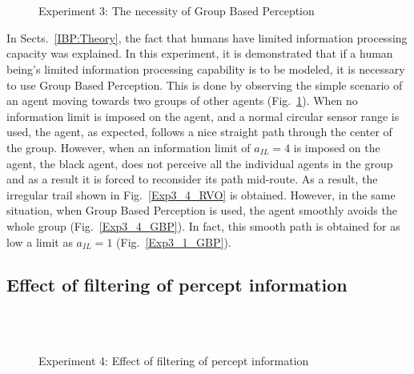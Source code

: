 \begin{figure}[!t]
  \centering
   \\
    \hspace{1pt}
  \\
  \hspace{1pt}
  \caption{Experiment 3: The necessity of Group Based Perception}
  \label{Exp3}
\end{figure}

In Sects.~\ref{IBP:Theory}, the fact that humans have limited information processing capacity was explained. In this experiment, it is demonstrated that if a human being's limited information processing capability is to be modeled, it is necessary to use Group Based Perception. This is done by observing the simple scenario of an agent moving towards two groups of other agents (Fig.~\ref{Exp3}). When no information limit is imposed on the agent, and a normal circular sensor range is used, the agent, as expected, follows a nice straight path through the center of the group. However, when an information limit of $a_{IL} = 4$ is imposed on the agent, the black agent, does not perceive all the individual agents in the group and  as a result it is forced to reconsider its path mid-route. As a result, the irregular trail shown in Fig.~\ref{Exp3_4_RVO} is obtained. However, in the same situation, when Group Based Perception is used, the agent smoothly avoids the whole group (Fig.~\ref{Exp3_4_GBP}). In fact, this smooth path is obtained for as low a limit as $a_{IL} = 1$ (Fig.~\ref{Exp3_1_GBP}).

\subsection{Effect of filtering of percept information}

\begin{figure}[!tb]
  \centering
   \\
  \hspace{1pt}
  \\
  \hspace{1pt}
  \caption{Experiment 4: Effect of filtering of percept information}
  \label{Exp4}
\end{figure}

